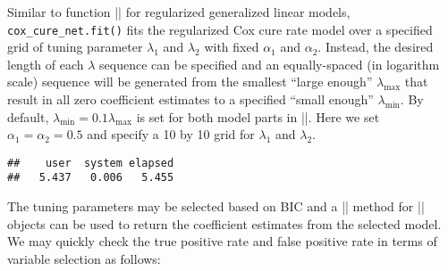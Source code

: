 Similar to function
\VERB|\OperatorTok{::}\NormalTok{()}|
for regularized generalized linear models, \texttt{cox\_cure\_net.fit()}
fits the regularized Cox cure rate model over a specified grid of tuning
parameter \(\lambda_1\) and \(\lambda_2\) with fixed \(\alpha_1\) and
\(\alpha_2\). Instead, the desired length of each \(\lambda\) sequence
can be specified and an equally-spaced (in logarithm scale) sequence
will be generated from the smallest ``large enough'' \(\lambda_{\max}\)
that result in all zero coefficient estimates to a specified ``small
enough'' \(\lambda_{\min}\). By default,
\(\lambda_{\min}=0.1\lambda_{\max}\) is set for both model parts in
\VERB|\NormalTok{()}|. Here we set
\(\alpha_1 = \alpha_2 = 0.5\) and specify a 10 by 10 grid for
\(\lambda_1\) and \(\lambda_2\).

\begin{Shaded}
\begin{Highlighting}[]
\NormalTok{(\{}
\StringTok{ }\NormalTok{(}
        \OperatorTok{$}\OperatorTok{$}
         \NormalTok{, } \NormalTok{,}
         \NormalTok{, } 
\NormalTok{    )}
\NormalTok{\})}
\end{Highlighting}
\end{Shaded}

\begin{verbatim}
##    user  system elapsed 
##   5.437   0.006   5.455
\end{verbatim}

The tuning parameters may be selected based on BIC and a
\VERB|\NormalTok{()}| method for
\VERB|| objects can be used to return the
coefficient estimates from the selected model. We may quickly check the
true positive rate and false positive rate in terms of variable
selection as follows:

